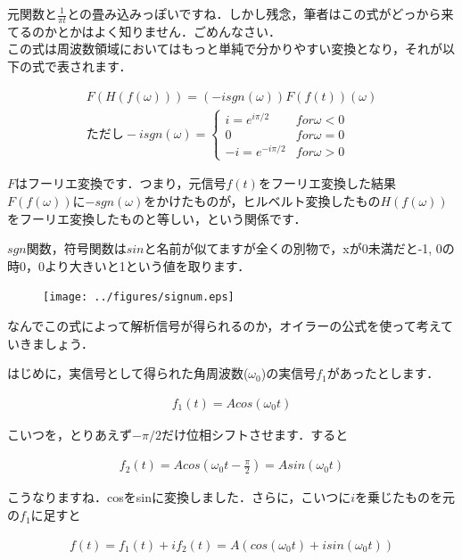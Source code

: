 \documentclass[11pt,a4paper]{ujreport} 	%
\begin{document}
元関数と$\frac{1}{\pi t}$との畳み込みっぽいですね．しかし残念，筆者はこの式がどっから来てるのかとかはよく知りません．ごめんなさい．\\

この式は周波数領域においてはもっと単純で分かりやすい変換となり，それが以下の式で表されます．


\begin{eqnarray}
  \label{eq:hilbert2}
  F(H(f(\omega))) = (-i sgn(\omega))F(f(t))(\omega)\\
  \text{ただし} -i sgn(\omega) =
  \begin{cases}
    i=e^{i\pi/2} & for \omega<0\\
    0 & for \omega = 0\\
    -i = e^{-i\pi/2} & for \omega > 0
  \end{cases}
\end{eqnarray}


$F$はフーリエ変換です．つまり，元信号$f(t)$をフーリエ変換した結果$F(f(\omega))$に$-sgn(\omega)$をかけたものが，ヒルベルト変換したもの$H(f(\omega))$をフーリエ変換したものと等しい，という関係です．

$sgn$関数，符号関数は$sin$と名前が似てますが全くの別物で，xが0未満だと-1, 0の時0，0より大きいと1という値を取ります．

\begin{figure}[H]
  \centering
  \texttt{[image: ../figures/signum.eps]}
\end{figure}

なんでこの式によって解析信号が得られるのか，オイラーの公式を使って考えていきましょう．

はじめに，実信号として得られた角周波数($\omega_0$)の実信号$f_1$があったとします．

\begin{eqnarray}
  f_1(t) = A cos(\omega_0 t)
\end{eqnarray}

こいつを，とりあえず$-\pi/2$だけ位相シフトさせます．すると

\begin{eqnarray}
  f_2(t) = A cos(\omega_0 t - \frac{\pi}{2}) = A sin(\omega_0 t)
\end{eqnarray}

こうなりますね．cosをsinに変換しました．さらに，こいつに$i$を乗じたものを元の$f_1$に足すと

\begin{eqnarray}
  \label{eq:hilbert3}
  f(t) = f_1(t) + if_2(t) = A(cos(\omega_0 t) + i sin(\omega_0 t))
\end{eqnarray}
\end{document}
